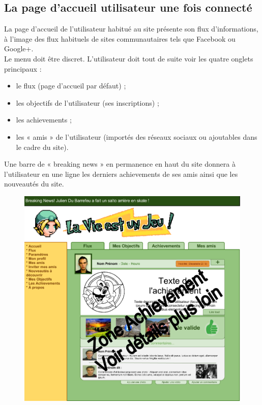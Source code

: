 \documentclass{life-fr}
\begin{document}
\subsection{La page d'accueil utilisateur une fois connecté}

La page d'accueil de l'utilisateur habitué au site présente son flux d'informations, à l'image des flux habituels de sites communautaires tels que Facebook ou Google+. \\

Le menu doit être discret. L'utilisateur doit tout de suite voir les quatre onglets principaux :

\begin{itemize}
	\item le flux (page d'accueil par défaut) ;
	\item les objectifs de l'utilisateur (ses inscriptions) ;
	\item les achievements ;
	\item les « amis » de l'utilisateur (importés des réseaux sociaux ou ajoutables dans le cadre du site).
\end{itemize}

Une barre de « breaking news » en permanence en haut du site donnera à l'utilisateur en une ligne les derniers achievements de ses amis ainsi que les nouveautés du site.

\begin{figure}[H]
	\begin{center}
		\includegraphics[width=15cm]{img/accueil.png}
	\end{center}
\end{figure}
\end{document}

